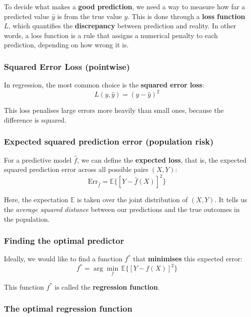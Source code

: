 \documentclass[
  letterpaper,
  DIV=11,
  numbers=noendperiod]{scrartcl}
\begin{document}
To decide what makes a \textbf{good prediction}, we need a way to
measure how far a predicted value \(\hat{y}\) is from the true value
\(y\). This is done through a \textbf{loss function} \(L\), which
quantifies the \textbf{discrepancy} between prediction and reality. In
other words, a loss function is a rule that assigns a numerical penalty
to each prediction, depending on how wrong it is.

\subsubsection{Squared Error Loss
(pointwise)}\label{squared-error-loss-pointwise}

In regression, the most common choice is the \textbf{squared error
loss}: \[L(y, \hat{y}) = (y - \hat{y})^2\]

This loss penalises large errors more heavily than small ones, because
the difference is squared.

\subsubsection{Expected squared prediction error (population
risk)}\label{expected-squared-prediction-error-population-risk}

For a predictive model \(\hat{f}\), we can define the \textbf{expected
loss}, that is, the expected squared prediction error across all
possible pairs \((X, Y)\):
\[ \text{Err}_{\hat{f}} = \mathbb{E}\{[Y - \hat{f}(X)]^2\} \]

Here, the expectation \(\mathbb{E}\) is taken over the joint
distribution of \((X, Y)\). It tells us the \emph{average squared
distance} between our predictions and the true outcomes in the
population.

\subsubsection{Finding the optimal
predictor}\label{finding-the-optimal-predictor}

Ideally, we would like to find a function \(f^*\) that
\textbf{minimises} this expected error:
\[ f^* = \arg \min_f \, \mathbb{E}\{[Y - f(X)]^2\} \]

This function \(f^*\) is called the \textbf{regression function}.

\subsubsection{The optimal regression
function}\label{the-optimal-regression-function}
\end{document}
